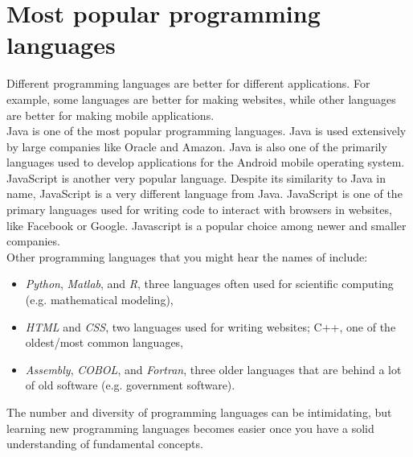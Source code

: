 \section{Most popular programming languages}

Different programming languages are better for different applications. For example, some languages are better for making websites, while other languages are better for making mobile applications. \\

Java is one of the most popular programming languages. Java is used extensively by large companies like Oracle and Amazon. Java is also one of the primarily languages used to develop applications for the Android mobile operating system. \\

JavaScript is another very popular language. Despite its similarity to Java in name, JavaScript is a very different language from Java. JavaScript is one of the primary languages used for writing code to interact with browsers in websites, like Facebook or Google. 
Javascript is a popular choice among newer and smaller companies. \\

Other programming languages that you might hear the names of include:
\begin{itemize}
\item \emph{Python}, \emph{Matlab}, and \emph{R}, three languages often used for scientific computing (e.g. mathematical modeling),
\item \emph{HTML} and \emph{CSS}, two languages used for writing websites; C++, one of the oldest/most common languages,
\item \emph{Assembly}, \emph{COBOL}, and \emph{Fortran}, three older languages that are behind a lot of old software (e.g. government software).
\end{itemize} 

The number and diversity of programming languages can be intimidating, but learning new programming languages becomes easier once you have a solid understanding of fundamental concepts. 

